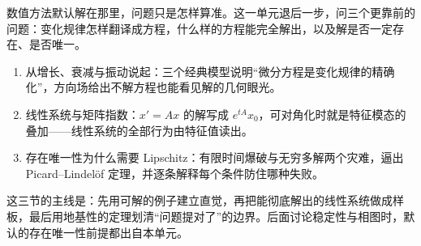 数值方法默认解在那里，问题只是怎样算准。这一单元退后一步，问三个更靠前的问题：变化规律怎样翻译成方程，什么样的方程能完全解出，以及解是否一定存在、是否唯一。

\begin{enumerate}
\def\labelenumi{\arabic{enumi}.}
\tightlist
\item
  从增长、衰减与振动说起：三个经典模型说明``微分方程是变化规律的精确化''，方向场给出不解方程也能看见解的几何眼光。
\item
  线性系统与矩阵指数：\(x'=Ax\) 的解写成 \(e^{tA}x_0\)，可对角化时就是特征模态的叠加——线性系统的全部行为由特征值读出。
\item
  存在唯一性为什么需要 Lipschitz：有限时间爆破与无穷多解两个灾难，逼出 Picard--Lindelöf 定理，并逐条解释每个条件防住哪种失败。
\end{enumerate}

这三节的主线是：先用可解的例子建立直觉，再把能彻底解出的线性系统做成样板，最后用地基性的定理划清``问题提对了''的边界。后面讨论稳定性与相图时，默认的存在唯一性前提都出自本单元。
